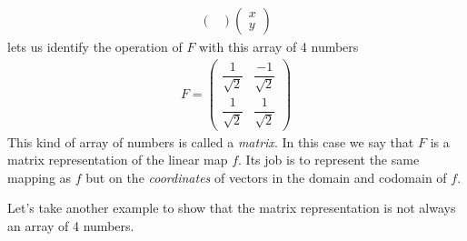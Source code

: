 {\begin{align*}
\begin{pmatrix}
\end{pmatrix}
\begin{pmatrix}
 x \\ y
\end{pmatrix}
\end{align*}
lets us identify the operation of $F$ with this array of 4 numbers
\begin{align*}
F
%
=
%
\begin{pmatrix}
 \dfrac{1}{\sqrt{2}} & \dfrac{-1}{\sqrt{2}} \\ 
 \dfrac{1}{\sqrt{2}} & \dfrac{1}{\sqrt{2}}
\end{pmatrix}
\end{align*}
\noindent This kind of array of numbers is called a \textit{matrix}. In this case we say that $F$ is a matrix representation of the linear map $f$. Its job is to represent the same mapping as $f$ but on the \textit{coordinates} of vectors in the domain and codomain of $f$.
}

\noindent Let's take another example to show that the matrix representation is not always an array of 4 numbers.

